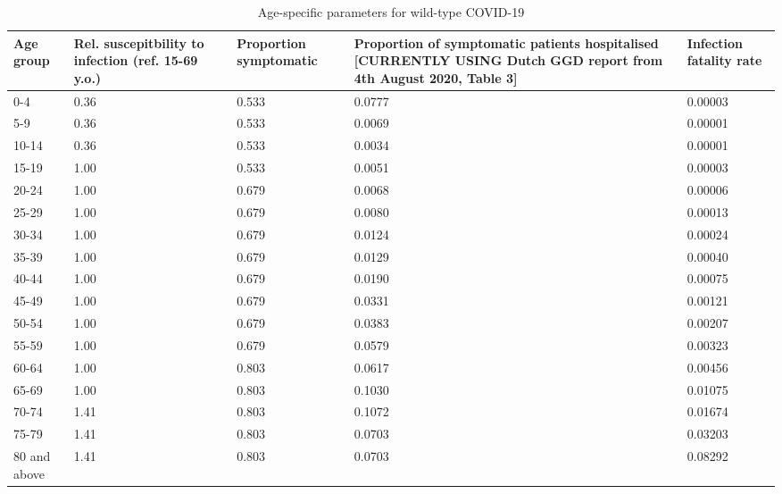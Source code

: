 \begin{table}
\centering
\caption{Age-specific parameters for wild-type COVID-19}
\label{agespec_table}
\begin{tabular}{p{2cm} p{3cm} p{3cm} p{3cm} p{3cm}}
\toprule
   Age group & Rel. suscepitbility to infection (ref. 15-69 y.o.)\cite{zhang2020a} & Proportion symptomatic\cite{sah2021} & Proportion of symptomatic patients hospitalised [CURRENTLY USING Dutch GGD report from 4th August 2020, Table 3] & Infection fatality rate\cite{odriscoll2021} \\
\midrule
0-4 & 0.36 & 0.533 & 0.0777 & 0.00003 \\
5-9 & 0.36 & 0.533 & 0.0069 & 0.00001 \\
10-14 & 0.36 & 0.533 & 0.0034 & 0.00001 \\
15-19 & 1.00 & 0.533 & 0.0051 & 0.00003 \\
20-24 & 1.00 & 0.679 & 0.0068 & 0.00006 \\
25-29 & 1.00 & 0.679 & 0.0080 & 0.00013 \\
30-34 & 1.00 & 0.679 & 0.0124 & 0.00024 \\
35-39 & 1.00 & 0.679 & 0.0129 & 0.00040 \\
40-44 & 1.00 & 0.679 & 0.0190 & 0.00075 \\
45-49 & 1.00 & 0.679 & 0.0331 & 0.00121 \\
50-54 & 1.00 & 0.679 & 0.0383 & 0.00207 \\
55-59 & 1.00 & 0.679 & 0.0579 & 0.00323 \\
60-64 & 1.00 & 0.803 & 0.0617 & 0.00456 \\
65-69 & 1.00 & 0.803 & 0.1030 & 0.01075 \\
70-74 & 1.41 & 0.803 & 0.1072 & 0.01674 \\
75-79 & 1.41 & 0.803 & 0.0703 & 0.03203 \\
80 and above & 1.41 & 0.803 & 0.0703 & 0.08292 \\
\bottomrule
\end{tabular}
\end{table}
